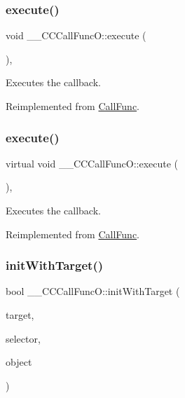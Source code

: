 \subsubsection{\texorpdfstring{execute()}{execute()}\hspace{0.1cm}{\footnotesize\ttfamily [1/2]}}
{\footnotesize\ttfamily void \+\_\+\+\_\+\+C\+C\+Call\+Func\+O\+::execute (\begin{DoxyParamCaption}{ }\end{DoxyParamCaption})\hspace{0.3cm}{\ttfamily [override]}, {\ttfamily [virtual]}}

Executes the callback. 

Reimplemented from \hyperlink{classCallFunc_a9a66dcb09103983ddab2ee2c89ae5c0e}{Call\+Func}.

\mbox{\label{class____CCCallFuncO_a89e4727ade4f68268afad8040fe08e81}} 
\subsubsection{\texorpdfstring{execute()}{execute()}\hspace{0.1cm}{\footnotesize\ttfamily [2/2]}}
{\footnotesize\ttfamily virtual void \+\_\+\+\_\+\+C\+C\+Call\+Func\+O\+::execute (\begin{DoxyParamCaption}{ }\end{DoxyParamCaption})\hspace{0.3cm}{\ttfamily [override]}, {\ttfamily [virtual]}}

Executes the callback. 

Reimplemented from \hyperlink{classCallFunc_a9a66dcb09103983ddab2ee2c89ae5c0e}{Call\+Func}.

\mbox{\label{class____CCCallFuncO_ae295b34998b51d676c97cb71662443bb}} 
\subsubsection{\texorpdfstring{init\+With\+Target()}{initWithTarget()}\hspace{0.1cm}{\footnotesize\ttfamily [1/2]}}
{\footnotesize\ttfamily bool \+\_\+\+\_\+\+C\+C\+Call\+Func\+O\+::init\+With\+Target (\begin{DoxyParamCaption}\item[{\hyperlink{classRef}{Ref} $\ast$}]{target,  }\item[{S\+E\+L\+\_\+\+Call\+FuncO}]{selector,  }\item[{\hyperlink{classRef}{Ref} $\ast$}]{object }\end{DoxyParamCaption})}

